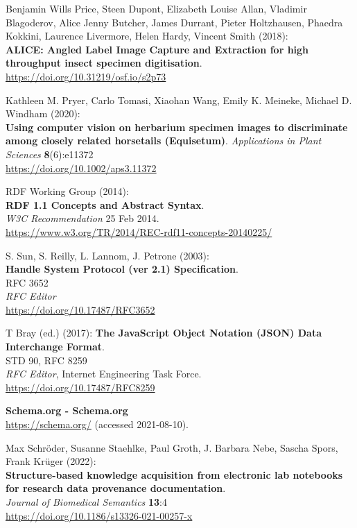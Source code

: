 \begin{thebibliography}{9}
Benjamin Wills Price, Steen Dupont, Elizabeth Louise Allan, Vladimir Blagoderov, Alice Jenny Butcher, James Durrant, Pieter Holtzhausen, Phaedra Kokkini, Laurence Livermore, Helen Hardy, Vincent Smith (2018):\\
\textbf{ALICE: Angled Label Image Capture and Extraction
for high throughput insect specimen digitisation}.\\
\url{https://doi.org/10.31219/osf.io/s2p73}

Kathleen M. Pryer, Carlo Tomasi, Xiaohan Wang, Emily K. Meineke, Michael D. Windham (2020):\\
\textbf{Using computer vision on herbarium specimen images
to discriminate among closely related horsetails (Equisetum)}.
\emph{Applications in Plant Sciences} \textbf{8}(6):e11372\\
\url{https://doi.org/10.1002/aps3.11372}

RDF Working Group (2014):\\
\textbf{RDF 1.1 Concepts and Abstract Syntax}.\\
\emph{W3C Recommendation} 25 Feb 2014.\\
\url{https://www.w3.org/TR/2014/REC-rdf11-concepts-20140225/}


S. Sun, S. Reilly, L. Lannom, J. Petrone (2003):\\
\textbf{Handle System Protocol (ver 2.1) Specification}.\\
RFC 3652\\
\emph{RFC Editor}\\
\url{https://doi.org/10.17487/RFC3652}


T Bray (ed.) (2017):
\textbf{The JavaScript Object Notation (JSON) Data
Interchange Format}.\\
STD 90, RFC 8259\\
\emph{RFC Editor}, 
Internet Engineering Task Force.\\
\url{https://doi.org/10.17487/RFC8259}

\textbf{Schema.org - Schema.org}\\
\url{https://schema.org/} (accessed 2021-08-10).

 Max Schröder, Susanne Staehlke, Paul Groth, J.
 Barbara Nebe, Sascha Spors, Frank Krüger (2022):\\
\textbf{Structure-based knowledge acquisition from electronic lab
notebooks for research data provenance documentation}.\\
\emph{Journal of Biomedical Semantics} \textbf{13}:4\\
\url{https://doi.org/10.1186/s13326-021-00257-x}


\end{thebibliography}
